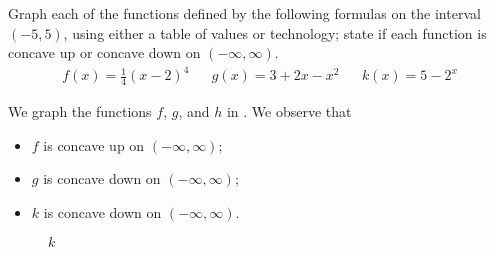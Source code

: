 \begin{pccexample}
Graph each of the functions defined 
by the following formulas on the interval $(-5,5)$, using either a table of values or technology; 
state if each function is concave up or concave down on $(-\infty,\infty)$.
\begin{align*}
	f(x)=\frac{1}{4}(x-2)^4 &   & g(x)=3+2x-x^2 &   & k(x)=5-2^x 
\end{align*}
\begin{pccsolution}
We graph the functions $f$, $g$, and $h$ in . We observe that
\begin{itemize}
	\item $f$ is concave up on $(-\infty,\infty)$;
	\item $g$ is concave down on $(-\infty,\infty)$;
	\item $k$ is concave down on $(-\infty,\infty)$.
\end{itemize}
\end{pccsolution}

\begin{figure}[!htb]
	\mbox{}
	\hfill
	\begin{minipage}{.25\textwidth}
		\caption{$f$}
		\label{exp:fig:concavef}
	\end{minipage}%
	\hfill
	\begin{minipage}{.25\textwidth}
		\caption{$g$}
		\label{exp:fig:concaveg}
	\end{minipage}%
	\hfill
	\begin{minipage}{.25\textwidth}
		\caption{$k$}
		\label{exp:fig:concavek}
	\end{minipage}%
	\hfill
	\mbox{}
\end{figure}
\end{pccexample}

